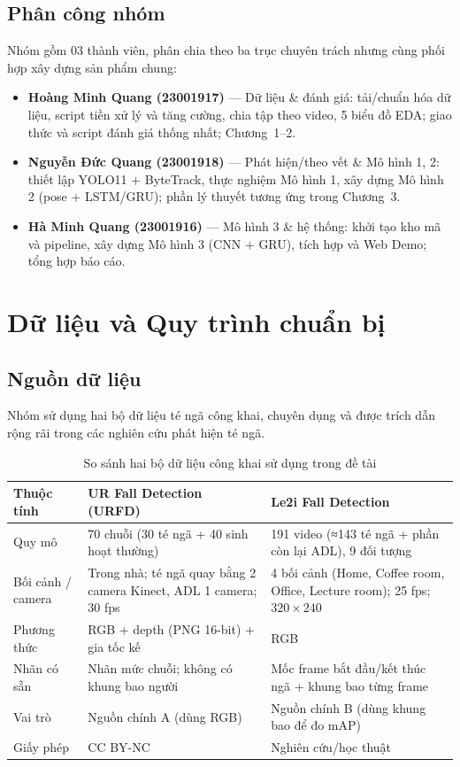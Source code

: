 \documentclass[fontsize=13pt,a4paper,oneside,DIV=calc,chapterprefix=true]{scrbook}
\begin{document}
\section{Phân công nhóm}
Nhóm gồm 03 thành viên, phân chia theo ba trục chuyên trách nhưng cùng phối hợp xây dựng sản phẩm chung:
\begin{itemize}[leftmargin=1.2cm]
    \item \textbf{Hoàng Minh Quang (23001917)} --- Dữ liệu \& đánh giá: tải/chuẩn hóa dữ liệu, script tiền xử lý và tăng cường, chia tập theo video, 5 biểu đồ EDA; giao thức và script đánh giá thống nhất; Chương~1--2.
    \item \textbf{Nguyễn Đức Quang (23001918)} --- Phát hiện/theo vết \& Mô hình 1, 2: thiết lập YOLO11 + ByteTrack, thực nghiệm Mô hình 1, xây dựng Mô hình 2 (pose + LSTM/GRU); phần lý thuyết tương ứng trong Chương~3.
    \item \textbf{Hà Minh Quang (23001916)} --- Mô hình 3 \& hệ thống: khởi tạo kho mã và pipeline, xây dựng Mô hình 3 (CNN + GRU), tích hợp và Web Demo; tổng hợp báo cáo.
\end{itemize}

\chapter{Dữ liệu và Quy trình chuẩn bị}
\label{chap:data}

\section{Nguồn dữ liệu}
Nhóm sử dụng hai bộ dữ liệu té ngã công khai, chuyên dụng và được trích dẫn rộng rãi trong các nghiên cứu phát hiện té ngã.

\begin{table}[H]
\centering
\caption{So sánh hai bộ dữ liệu công khai sử dụng trong đề tài}
\label{tab:datasets}
\small
\begin{tabularx}{\linewidth}{@{}p{3.1cm}XX@{}}
\toprule
\textbf{Thuộc tính} & \textbf{UR Fall Detection (URFD)} & \textbf{Le2i Fall Detection} \\
\midrule
Quy mô & 70 chuỗi (30 té ngã + 40 sinh hoạt thường) & 191 video (≈143 té ngã + phần còn lại ADL), 9 đối tượng \\
Bối cảnh / camera & Trong nhà; té ngã quay bằng 2 camera Kinect, ADL 1 camera; 30 fps & 4 bối cảnh (Home, Coffee room, Office, Lecture room); 25 fps; $320\times240$ \\
Phương thức & RGB + depth (PNG 16-bit) + gia tốc kế & RGB \\
Nhãn có sẵn & Nhãn mức chuỗi; không có khung bao người & Mốc frame bắt đầu/kết thúc ngã + khung bao từng frame \\
Vai trò & Nguồn chính A (dùng RGB) & Nguồn chính B (dùng khung bao để đo mAP) \\
Giấy phép & CC BY-NC & Nghiên cứu/học thuật \\
\bottomrule
\end{tabularx}
\end{table}
\end{document}
